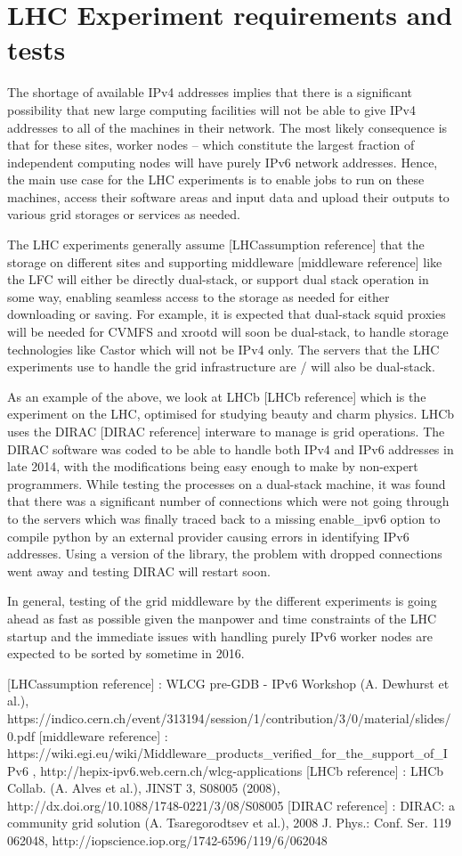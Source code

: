 \section{LHC Experiment requirements and tests}

The shortage of available IPv4 addresses implies that there is a significant possibility that new large
computing facilities will not be able to give IPv4 addresses to all of the machines in their network. The
most likely consequence is that for these sites, worker nodes -- which constitute the largest fraction of
independent computing nodes will have purely IPv6 network addresses. Hence, the main use case for the LHC
experiments is to enable jobs to run on these machines, access their software areas and input data and
upload their outputs to various grid storages or services as needed.

The LHC experiments generally assume [LHCassumption reference] that the storage on different sites and
supporting middleware [middleware reference] like the LFC will either be directly dual-stack, or support
dual stack operation in some way, enabling seamless access to the storage as needed for either downloading
or saving. For example, it is expected that dual-stack squid proxies will be needed for CVMFS and xrootd
will soon be dual-stack, to handle storage technologies like Castor which will not be IPv4 only. The
servers that the LHC experiments use to handle the grid infrastructure are / will also be dual-stack.

As an example of the above, we look at LHCb [LHCb reference] which is the experiment on the LHC, optimised
for studying beauty and charm physics. LHCb uses the DIRAC [DIRAC reference] interware to manage is grid
operations. The DIRAC software was coded to be able to handle both IPv4 and IPv6 addresses in late 2014,
with the modifications being easy enough to make by non-expert programmers. While testing the processes
on a dual-stack machine, it was found that there was a significant number of connections which were not
going through to the servers which was finally traced back to a missing enable\_ipv6 option to compile python
by an external provider causing errors in identifying IPv6 addresses. Using a version of the library, the
problem with dropped connections went away and testing DIRAC will restart soon.

In general, testing of the grid middleware by the different experiments is going ahead as fast as possible
given the manpower and time constraints of the LHC startup and the immediate issues with handling purely
IPv6 worker nodes are expected to be sorted by sometime in 2016.

[LHCassumption reference] : WLCG pre-GDB - IPv6 Workshop (A. Dewhurst et al.), https://indico.cern.ch/event/313194/session/1/contribution/3/0/material/slides/0.pdf
[middleware reference] : https://wiki.egi.eu/wiki/Middleware\_products\_verified\_for\_the\_support\_of\_IPv6 , http://hepix-ipv6.web.cern.ch/wlcg-applications
[LHCb reference] : LHCb Collab. (A. Alves et al.), JINST 3, S08005 (2008), http://dx.doi.org/10.1088/1748-0221/3/08/S08005
[DIRAC reference] : DIRAC: a community grid solution (A. Tsaregorodtsev et al.), 2008 J. Phys.: Conf. Ser. 119 062048, http://iopscience.iop.org/1742-6596/119/6/062048


